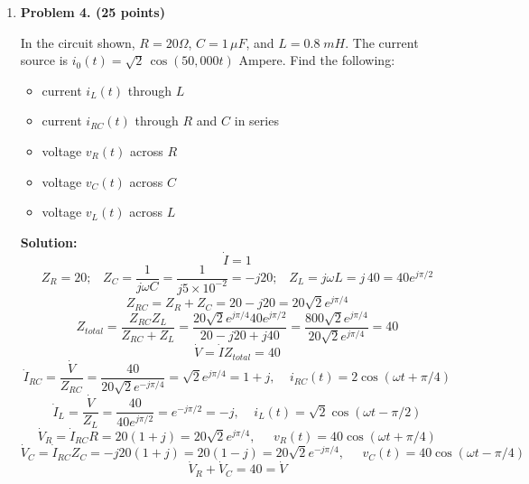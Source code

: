 \begin{enumerate}
\item {\bf Problem 4. (25 points)}


In the circuit shown, $R=20 \Omega$, $C=1\,\mu F$, and $L=0.8\;mH$. 
The current source is $i_0(t)=\sqrt{2}\,\cos(50,000 t)$ Ampere. 
Find the following:
\begin{itemize}
\item current $i_L(t)$ through $L$ 
\item current $i_{RC}(t)$ through $R$ and $C$ in series
\item voltage $v_R(t)$ across $R$
\item voltage $v_C(t)$ across $C$
\item voltage $v_L(t)$ across $L$
\end{itemize}

{\bf Solution:} 
\[
\dot{I}=1
\]
\[
Z_R=20;\;\;\;Z_C=\frac{1}{j\omega C}=\frac{1}{j5\times 10^{-2}}=-j20;\;\;\;
Z_L=j\omega L=j\,40=40 e^{j\pi/2}
\]
\[
Z_{RC}=Z_R+Z_C=20-j20=20\sqrt{2}e^{j\pi/4}
\]
\[ 
Z_{total}=\frac{Z_{RC} Z_L}{Z_{RC}+Z_L}
=\frac{20\sqrt{2}e^{j\pi/4} 40 e^{j\pi/2}}{20-j20+j40}
=\frac{800\sqrt{2}e^{j\pi/4}}{20\sqrt{2}e^{j\pi/4}}=40
\]
\[
\dot{V}=\dot{I}Z_{total}=40
\]
\[ 
\dot{I}_{RC}=\frac{\dot{V}}{Z_{RC}}=\frac{40}{20\sqrt{2} e^{-j\pi/4}}=\sqrt{2}e^{j\pi/4}
=1+j,\;\;\;\;i_{RC}(t)=2\cos(\omega t+\pi/4)
\]
\[
\dot{I}_{L}=\frac{\dot{V}}{Z_L}=\frac{40}{40 e^{j\pi/2}}=e^{-j\pi/2}=-j,\;\;\;\;
i_L(t)=\sqrt{2}\cos(\omega t-\pi/2)
\]
\[
\dot{V}_R=\dot{I}_{RC} R=20(1+j)=20\sqrt{2}e^{j\pi/4},\;\;\;\;\;v_R(t)=40\cos(\omega t+\pi/4)
\]
\[
\dot{V}_C=\dot{I}_{RC} Z_C=-j 20(1+j)=20(1-j)=20\sqrt{2}e^{-j\pi/4},\;\;\;\;\;
v_C(t)=40\cos(\omega t-\pi/4)
\]
\[ 
\dot{V}_R+\dot{V}_C=40=\dot{V}
\]

\end{enumerate}



